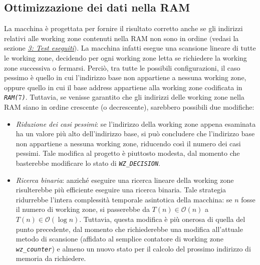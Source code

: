 \documentclass[12pt,a4paper,titlepage]{article}
\begin{document}
		\subsection{Ottimizzazione dei dati nella RAM} \label{sec:ottimizzazione}
			La macchina è progettata per fornire il risultato corretto anche se gli indirizzi relativi alle working zone contenuti nella RAM non sono in ordine $($vedasi la sezione \hyperref[sec:test]{\textit{3: Test eseguiti}}$)$.
			La macchina infatti esegue una scansione lineare di tutte le working zone, decidendo per ogni working zone letta se richiedere la working zone successiva o fermarsi. Perciò, tra tutte le possibili configurazioni, il caso pessimo è quello in cui l'indirizzo base non appartiene a nessuna working zone, oppure quello in cui il base address appartiene alla working zone codificata in \textit{\texttt{RAM($7$)}}.
			Tuttavia, se venisse garantito che gli indirizzi delle working zone nella RAM siano in ordine crescente (o decrescente), sarebbero possibili due modifiche:
			\begin{itemize}
			
			\item \textit{Riduzione dei casi pessimi}: se l'indirizzo della working zone appena esaminata ha un valore più alto dell'indirizzo base, si può concludere che l'indirizzo base non appartiene a nessuna working zone, riducendo così il numero dei casi pessimi. Tale modifica al progetto è piuttosto modesta, dal momento che basterebbe modificare lo stato di \textit{\texttt{WZ\_DECISION}}.
			
			\item \textit{Ricerca binaria}: anziché eseguire una ricerca lineare della working zone risulterebbe più efficiente eseguire una ricerca binaria. Tale strategia ridurrebbe l'intera complessità temporale asintotica della macchina: se $n$ fosse il numero di working zone, si passerebbe da $T(n) \in \mathcal{O}(n)$ a $T(n) \in \mathcal{O}(\log n)$. Tuttavia, questa modifica è più onerosa di quella del punto precedente, dal momento che richiederebbe una modifica all'attuale metodo di scansione (affidato al semplice contatore di working zone \textit{\texttt{wz\_counter}}) e almeno un nuovo stato per il calcolo del prossimo indirizzo di memoria da richiedere.
			\end{itemize}
\end{document}
